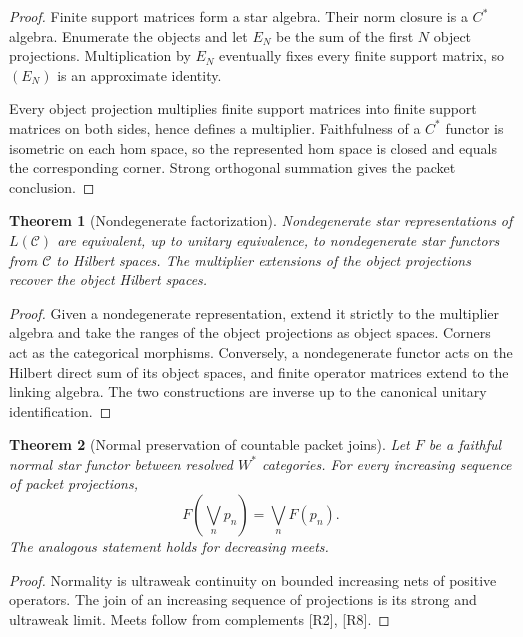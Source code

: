 \documentclass{aomart}
\newtheorem{theorem}{Theorem}[section]
\theoremstyle{definition}
\theoremstyle{remark}
\newcommand{\Ccal}{\mathcal C}
\newcommand{\Rcite}[1]{\textup{[#1]}}
\begin{document}
\begin{proof}
Finite support matrices form a star algebra. Their norm closure is a \(C^*\) algebra. Enumerate the objects and let \(E_N\) be the sum of the first \(N\) object projections. Multiplication by \(E_N\) eventually fixes every finite support matrix, so \((E_N)\) is an approximate identity.

Every object projection multiplies finite support matrices into finite support matrices on both sides, hence defines a multiplier. Faithfulness of a \(C^*\) functor is isometric on each hom space, so the represented hom space is closed and equals the corresponding corner. Strong orthogonal summation gives the packet conclusion.
\end{proof}

\begin{theorem}[Nondegenerate factorization]\label{thm:nondegenerate_factorization}
Nondegenerate star representations of \(L(\Ccal)\) are equivalent, up to unitary equivalence, to nondegenerate star functors from \(\Ccal\) to Hilbert spaces. The multiplier extensions of the object projections recover the object Hilbert spaces.
\end{theorem}

\begin{proof}
Given a nondegenerate representation, extend it strictly to the multiplier algebra and take the ranges of the object projections as object spaces. Corners act as the categorical morphisms. Conversely, a nondegenerate functor acts on the Hilbert direct sum of its object spaces, and finite operator matrices extend to the linking algebra. The two constructions are inverse up to the canonical unitary identification.
\end{proof}

\begin{theorem}[Normal preservation of countable packet joins]\label{thm:normal_joins}
Let \(F\) be a faithful normal star functor between resolved \(W^*\) categories. For every increasing sequence of packet projections,
\[
 F\left(\bigvee_np_n\right)
 =
 \bigvee_nF(p_n).
\]
The analogous statement holds for decreasing meets.
\end{theorem}

\begin{proof}
Normality is ultraweak continuity on bounded increasing nets of positive operators. The join of an increasing sequence of projections is its strong and ultraweak limit. Meets follow from complements \Rcite{R2}, \Rcite{R8}.
\end{proof}
\end{document}
